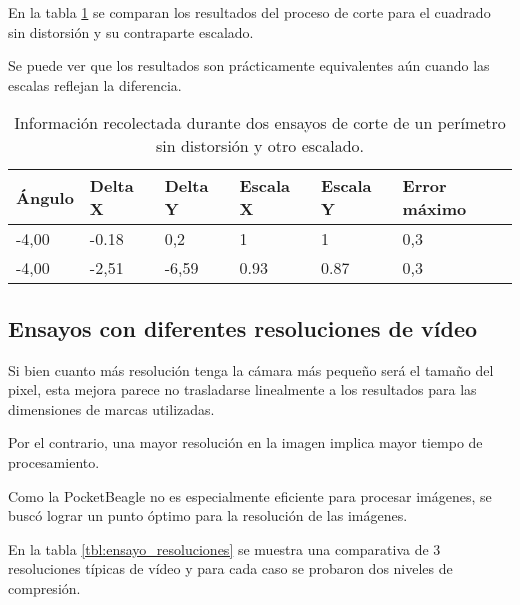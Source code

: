       En la tabla \ref{tbl:ensayo_escalado} se comparan los resultados del proceso de corte para el cuadrado sin distorsión y su contraparte escalado.\par
      Se puede ver que los resultados son prácticamente equivalentes aún cuando las escalas reflejan la diferencia.

      \begin{table}[!ht]
         \centering
         \caption[Ensayos de corte simulado escalado]{Información recolectada durante dos ensayos de corte de un perímetro sin distorsión y otro escalado.}
         \begin{tabular}[!ht]{llllll}
            \toprule
            \textbf{Ángulo} & \textbf{Delta X} & \textbf{Delta Y} & \textbf{Escala X} & \textbf{Escala Y} & \textbf{Error máximo}\\
            \midrule
            {-4,00}& {-0.18}& {0,2}   & {1}    & {1}    & {0,3}\\
            {-4,00}& {-2,51}& {-6,59} & {0.93} & {0.87} & {0,3}\\
            \bottomrule
         \end{tabular}
         \label{tbl:ensayo_escalado}
      \end{table}

\subsection{Ensayos con diferentes resoluciones de vídeo}

Si bien cuanto más resolución tenga la cámara más pequeño será el tamaño del pixel, esta mejora parece no trasladarse linealmente a los resultados para las dimensiones de marcas utilizadas.\par
Por el contrario, una mayor resolución en la imagen implica mayor tiempo de procesamiento.\par
Como la PocketBeagle no es especialmente eficiente para procesar imágenes, se buscó lograr un punto óptimo para la resolución de las imágenes. \par
En la tabla \ref{tbl:ensayo_resoluciones} se muestra una comparativa de 3 resoluciones típicas de vídeo y para cada caso se probaron dos niveles de compresión.\par


